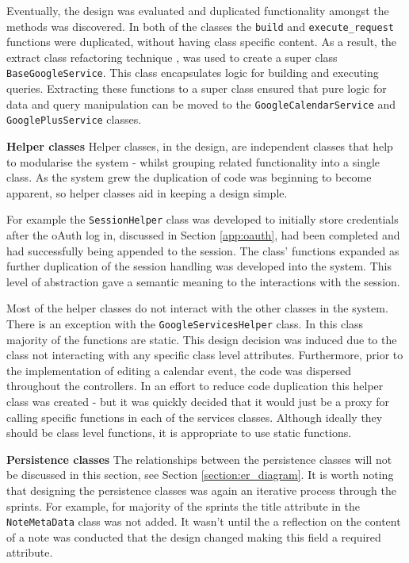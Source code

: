Eventually, the design was evaluated and duplicated functionality amongst the methods was discovered. In both of the classes the \texttt{build} and \texttt{execute\_request} functions were duplicated, without having class specific content. As a result, the extract class refactoring technique \cite{citeulike:14023810}, was used to create a super class \texttt{BaseGoogleService}. This class encapsulates logic for building  and executing queries. Extracting these functions to a super class ensured that pure logic for data and query manipulation can be moved to the \texttt{GoogleCalendarService} and \texttt{GooglePlusService} classes.


\noindent
\textbf{Helper classes}
\newline
Helper classes, in the design, are independent classes that help to modularise the system - whilst grouping related functionality into a single class. As the system grew the duplication of code was beginning to become apparent, so helper classes aid in keeping a design simple.

For example the \texttt{SessionHelper} class was developed to initially store credentials after the oAuth log in, discussed in Section \ref{app:oauth}, had been completed and had successfully being appended to the session. The class' functions expanded as further duplication of the session handling was developed into the system.  This level of abstraction gave a semantic meaning to the interactions with the session.

Most of the helper classes do not interact with the other classes in the system. There is an exception with the \texttt{GoogleServicesHelper} class. In this class majority of the functions are static. This design decision was induced due to the class not interacting with any specific class level attributes. Furthermore, prior to the implementation of editing a calendar event, the code was dispersed throughout the controllers. In an effort to reduce code duplication this helper class was created - but it was quickly decided that it would just be a proxy for calling specific functions in each of the services classes. Although ideally they should be class level functions, it is appropriate to use static functions.

\noindent
\textbf{Persistence classes}
\newline
The relationships between the persistence classes will not be discussed in this section, see Section \ref{section:er_diagram}. It is worth noting that designing the persistence classes was again an iterative process through the sprints. For example, for majority of the sprints the title attribute in the \texttt{NoteMetaData} class was not added. It wasn't until the a reflection on the content of a note was conducted that the design changed making this field a required attribute.


